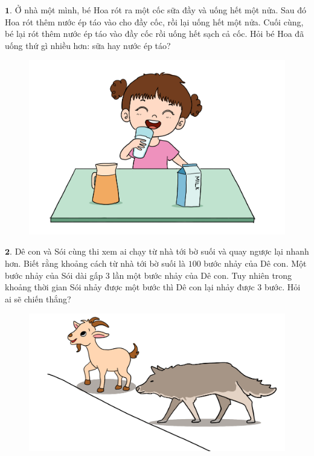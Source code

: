 \begin{multicols}{2}
	$\pmb{1.}$ Ở nhà một mình, bé Hoa rót ra một cốc sữa đầy và uống hết một nửa. Sau đó Hoa rót thêm nước ép táo vào cho đầy cốc, rồi lại uống hết một nửa. Cuối cùng, bé lại rót thêm nước ép táo vào đầy cốc rồi uống hết sạch cả cốc. Hỏi bé Hoa đã uống thứ gì nhiều hơn: sữa hay nước ép táo?
	\begin{figure}[H]
		\centering
		\vspace*{-5pt}
		\captionsetup{labelformat= empty, justification=centering}
		\includegraphics[width=0.9\linewidth]{Pi6_bai1}
		\vspace*{-5pt}
	\end{figure}
	$\pmb{2.}$ Dê con và Sói cùng thi xem ai chạy từ nhà tới bờ suối và quay ngược lại nhanh hơn. Biết rằng khoảng cách từ nhà tới bờ suối là $100$ bước nhảy của Dê con. Một bước nhảy của Sói dài gấp $3$ lần một bước nhảy của Dê con. Tuy nhiên trong khoảng thời gian Sói nhảy được một bước thì Dê con lại nhảy được $3$ bước. Hỏi ai sẽ chiến thắng?
	\begin{figure}[H]
		\centering
		\vspace*{-5pt}
		\captionsetup{labelformat= empty, justification=centering}
		\includegraphics[width=0.95\linewidth]{Pi6_bai2}

\end{figure}
\end{multicols}
